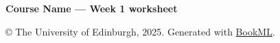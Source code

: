 \documentclass[12pt,oneside]{article}
\newcommand\coursename{Course Name}
\newcommand\weeknumber{1}
\newcommand\coursedescription{Week \weeknumber{} worksheet}
\begin{document}
\setcounter{week}{\weeknumber}
{\Huge\textbf{\coursename{} --- \coursedescription}}





\iflatexml
    \copyright{} The University of Edinburgh, 2025. Generated with \href{https://vlmantova.github.io/bookml/}{BookML}.
\fi
\end{document}
